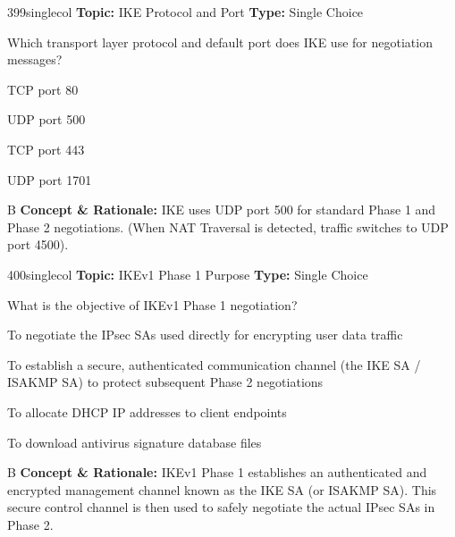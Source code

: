 \begin{qcard}{399}{singlecol}
\textcolor{darkslate!75}{\small\textbf{Topic:} IKE Protocol and Port \hfill \textbf{Type:} Single Choice}\vspace{0.4em}\par
Which transport layer protocol and default port does IKE use for negotiation messages?
\begin{qoptions}
\item TCP port 80
\item UDP port 500
\item TCP port 443
\item UDP port 1701
\end{qoptions}
\end{qcard}
\nopagebreak
\begin{explainbox}{B}
\textbf{Concept \& Rationale:} IKE uses UDP port 500 for standard Phase 1 and Phase 2 negotiations. (When NAT Traversal is detected, traffic switches to UDP port 4500).
\end{explainbox}

\begin{qcard}{400}{singlecol}
\textcolor{darkslate!75}{\small\textbf{Topic:} IKEv1 Phase 1 Purpose \hfill \textbf{Type:} Single Choice}\vspace{0.4em}\par
What is the objective of IKEv1 Phase 1 negotiation?
\begin{qoptions}
\item To negotiate the IPsec SAs used directly for encrypting user data traffic
\item To establish a secure, authenticated communication channel (the IKE SA / ISAKMP SA) to protect subsequent Phase 2 negotiations
\item To allocate DHCP IP addresses to client endpoints
\item To download antivirus signature database files
\end{qoptions}
\end{qcard}
\nopagebreak
\begin{explainbox}{B}
\textbf{Concept \& Rationale:} IKEv1 Phase 1 establishes an authenticated and encrypted management channel known as the IKE SA (or ISAKMP SA). This secure control channel is then used to safely negotiate the actual IPsec SAs in Phase 2.
\end{explainbox}

